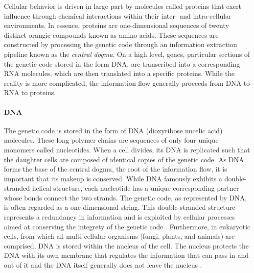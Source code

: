 Cellular behavior is driven in large part by molecules called proteins that exert influence through chemical interactions within their inter- and intra-cellular environments.
In essence, proteins are one-dimensional sequences of twenty distinct orangic compounds known as amino acids.
These sequences are constructed by processing the genetic code through an information extraction pipeline known as the \emph{central dogma}.
On a high level, genes, particular sections of the genetic code stored in the form DNA, are transcribed into a corresponding RNA molecules, which are then translated into a specific proteins.
While the reality is more complicated, the information flow generally proceeds from DNA to RNA to proteins.

\paragraph{DNA} The genetic code is stored in the form of DNA (dioxyribose nucelic acid) molecules.
These long polymer chains are sequences of only four unique monomers called nucleotides.
When a cell divides, its DNA is replicated such that the daughter cells are composed of identical copies of the genetic code.
As DNA forms the base of the central dogma, the root of the information flow, it is important that its makeup is conserved.
While DNA famously exhibits a double-stranded helical structure,
each nucleotide has a unique corresponding partner whose bonds connect the two strands.
The genetic code, as represented by DNA, is often regarded as a one-dimensional string.
This double-stranded structure represents a redundancy in information and is exploited by cellular processes aimed at conserving the integrety of the genetic code \cite{need}.
Furthermore, in eukaryotic cells, from which all multi-cellular organisms (fungi, plants, and animals) are comprised, DNA is stored within the nucleus of the cell.
The nucleus protects the DNA with its own membrane that regulates the information that can pass in and out of it and the DNA itself generally does not leave the nucleus \cite{}.

